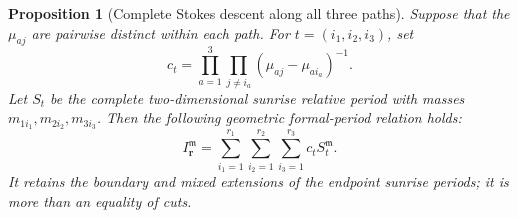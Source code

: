\documentclass[11pt,a4paper,oneside]{article}
\theoremstyle{plain}
\newtheorem{proposition}[theorem]{Proposition}
\theoremstyle{definition}
\theoremstyle{remark}
\numberwithin{equation}{section}
\begin{document}
\begin{proposition}[Complete Stokes descent along all three paths]\label{unified:prop:thetastokes}
Suppose that the $\mu_{aj}$ are pairwise distinct within each path. For
$t=(i_1,i_2,i_3)$, set
\[
 c_t=\prod_{a=1}^3\prod_{j\ne i_a}(\mu_{aj}-\mu_{ai_a})^{-1}.
\]
Let $S_t$ be the complete two-dimensional sunrise relative period with masses $m_{1i_1},m_{2i_2},m_{3i_3}$.
Then the following geometric formal-period relation holds:
\begin{equation}\label{unified:eq:thetaformal}
 I_{\mathbf r}^{\mathfrak m}=\sum_{i_1=1}^{r_1}
       \sum_{i_2=1}^{r_2}\sum_{i_3=1}^{r_3}c_tS_t^{\mathfrak m}.
\end{equation}
It retains the boundary and mixed extensions of the endpoint sunrise periods; it is more than an equality of cuts.
\end{proposition}
\end{document}
